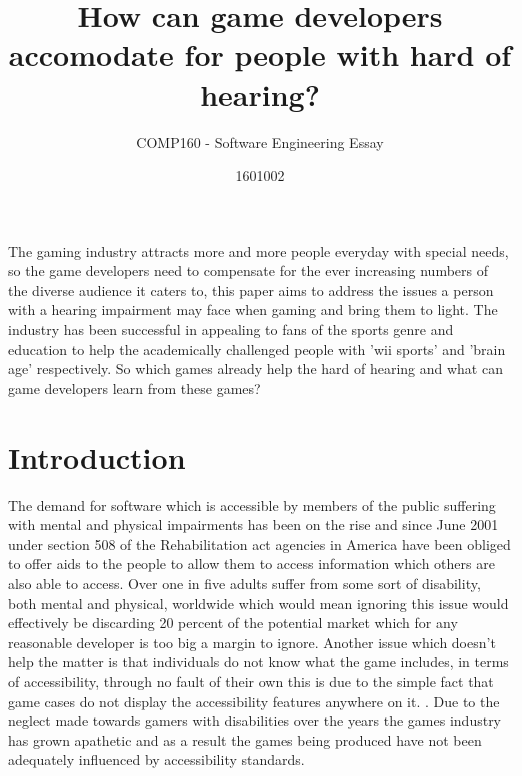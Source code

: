\documentclass{scrartcl}
\title{How can game developers accomodate for people with hard of hearing?}
\subtitle{COMP160 - Software Engineering Essay}
\author{1601002}
\begin{document}
\maketitle

\abstract
The gaming industry attracts more and more people everyday with special needs, so the game developers need to compensate for the ever increasing numbers of the diverse audience it caters to, this paper aims to address the issues a person with a hearing impairment may face when gaming and bring them to light. The industry has been successful in appealing to fans of the sports genre and education to help the academically challenged people with 'wii sports' and 'brain age' respectively. So which games already help the hard of hearing and what can game developers learn from these games?

\section{Introduction}
The demand for software which is accessible by members of the public suffering with mental and physical impairments has been on the rise and since June 2001 under section 508 of the Rehabilitation act \cite{cohen2005accessibility} agencies in America have been obliged to offer aids to the people to allow them to access information which others are also able to access. Over one in five adults suffer from some sort of disability, both mental and physical, worldwide \cite{sierkowski2002achieving} which would mean ignoring this issue would effectively be discarding 20 percent of the potential market which for any reasonable developer is too big a margin to ignore.  Another issue which doesn't help the matter is that individuals do not know what the game includes, in terms of accessibility, through no fault of their own this is due to the simple fact that game cases do not display the accessibility features anywhere on it. \cite {bierre2005game}. Due to the neglect made towards gamers with disabilities over the years the games industry has grown apathetic and as a result the games being produced have not been adequately influenced by accessibility standards.\cite{porter2013empirical}
\end{document}
